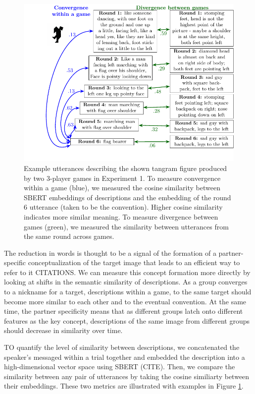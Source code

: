\documentclass[
  english,
  a4paper,
]{article}
\begin{document}
\begin{figure}[t!]

{\centering \includegraphics[width=1\linewidth]{sbert} 

}

\caption{Example utterances describing the shown tangram figure produced by two 3-player games in Experiment 1. To measure convergence within a game (blue), we measured the cosine similarity between SBERT embeddings of descriptions and the embedding of the round 6 utterance (taken to be the convention). Higher cosine similarity indicates more similar meaning. To measure divergence between games (green), we measured the similarity between utterances from the same round across games.}\label{fig:sbert-diagram}
\end{figure}

The reduction in words is thought to be a signal of the formation of a partner-specific conceptualization of the target image that leads to an efficient way to refer to it CITATIONS. We can measure this concept formation more directly by looking at shifts in the semantic similarity of descriptions. As a group converges to a nickname for a target, descriptions within a game, to the same target should become more similar to each other and to the eventual convention. At the same time, the partner specificity means that as different groups latch onto different features as the key concept, descriptions of the same image from different groups should decrease in similarity over time.

TO quantify the level of similarity between descriptions, we concatenated the speaker's messaged within a trial together and embedded the description into a high-dimensional vector space using SBERT (CITE). Then, we compare the similarity between any pair of utterances by taking the cosine similiarty between their embeddings. These two metrics are illustrated with examples in Figure \ref{fig:sbert-diagram}.
\end{document}

